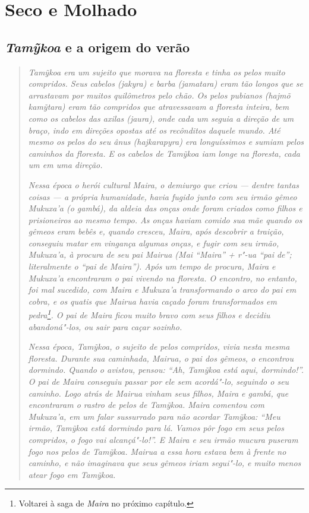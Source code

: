 \section{Seco e Molhado}\label{seco-e-molhado}

\subsection{\emph{Tamỹkoa} e a origem do verão}

\begin{quote}


\emph{\emph{Tamỹkoa} era um sujeito que morava na floresta e tinha os pelos
muito compridos. Seus cabelos (\emph{jakyra}) e barba (\emph{jamatara})
eram tão longos que se arrastavam por muitos quilômetros pelo chão. Os
pelos pubianos (\emph{hajmõ} \emph{kamỹtara}) eram tão compridos que
atravessavam a floresta inteira, bem como os cabelos das axilas
(\emph{jaura}), onde cada um seguia a direção de um braço, indo em
direções opostas até os recônditos daquele mundo. Até mesmo os pelos do
seu ânus (\emph{hajkarapyra}) era longuíssimos e sumiam pelos caminhos
da floresta. E os cabelos de \emph{Tamỹkoa} iam longe na floresta, cada
um em uma direção.}

\emph{Nessa época o herói cultural \emph{Maira}, o demiurgo que criou --- dentre
tantas coisas --- a própria humanidade, havia fugido junto com seu irmão
gêmeo \emph{Mukuxa'a} (o gambá), da aldeia das onças onde foram criados
como filhos e prisioneiros ao mesmo tempo. As onças haviam comido sua
mãe quando os gêmeos eram bebês e, quando cresceu, \emph{Maira}, após
descobrir a traição, conseguiu matar em vingança algumas onças, e fugir
com seu irmão, \emph{Mukuxa'a}, à procura de seu pai \emph{Mairua}
(\emph{Mai} ``\emph{Maira}'' + \emph{r"-ua} ``pai de''; literalmente o
``pai de \emph{Maira}''). Após um tempo de procura, \emph{Maira} e
\emph{Mukuxa'a} encontraram o pai vivendo na floresta. O encontro, no
entanto, foi mal sucedido, com \emph{Maira} e \emph{Mukuxa'a} transformando o
arco do pai em cobra, e os quatis que \emph{Mairua} havia caçado foram
transformados em pedra\footnote{Voltarei à saga de \emph{Maira} no
  próximo capítulo.}. O pai de \emph{Maira} ficou muito bravo com seus
filhos e decidiu abandoná"-los, ou sair para caçar sozinho.}

\emph{Nessa época, \emph{Tamỹkoa}, o sujeito de pelos compridos, vivia nesta
mesma floresta. Durante sua caminhada, \emph{Mairua}, o pai dos gêmeos,
o encontrou dormindo. Quando o avistou, pensou: ``Ah, \emph{Tamỹkoa}
está aqui, dormindo!''. O pai de \emph{Maira} conseguiu passar por ele
sem acordá"-lo, seguindo o seu caminho. Logo atrás de \emph{Mairua}
vinham seus filhos, \emph{Maira} e gambá, que encontraram o rastro de
pelos de \emph{Tamỹkoa}. \emph{Maira} comentou com \emph{Mukuxa'a}, em
um falar sussurrado para não acordar \emph{Tamỹkoa}: ``Meu irmão,
\emph{Tamỹkoa} está dormindo para lá. Vamos pôr fogo em seus pelos
compridos, o fogo vai alcançá"-lo!''. E \emph{Maira} e seu irmão mucura
puseram fogo nos pelos de \emph{Tamỹkoa}. \emph{Mairua} a essa hora
estava bem à frente no caminho, e não imaginava que seus gêmeos iriam
segui"-lo, e muito menos atear fogo em \emph{Tamỹkoa}.}


\end{quote}
